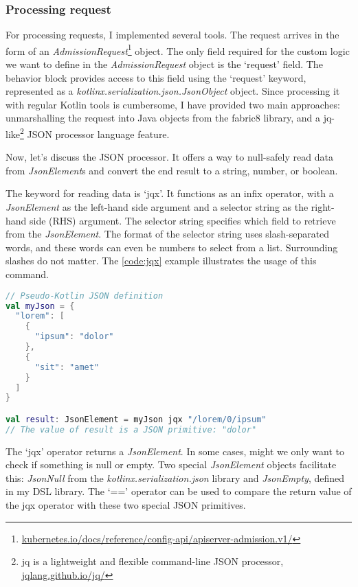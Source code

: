 \subsubsection{Processing request}

For processing requests, I implemented several tools. The request arrives in the form of an \emph{AdmissionRequest}\footnote{\url{kubernetes.io/docs/reference/config-api/apiserver-admission.v1/}} object. The only field required for the custom logic we want to define in the \emph{AdmissionRequest} object is the `request' field. The behavior block provides access to this field using the `request' keyword, represented as a \emph{kotlinx.serialization.json.JsonObject} object. Since processing it with regular Kotlin tools is cumbersome, I have provided two main approaches: unmarshalling the request into Java objects from the fabric8 library, and a jq-like\footnote{jq is a lightweight and flexible command-line JSON processor, \url{jqlang.github.io/jq/}} JSON processor language feature.

Now, let's discuss the JSON processor. It offers a way to null-safely read data from \emph{JsonElement}s and convert the end result to a string, number, or boolean.

The keyword for reading data is `jqx'. It functions as an infix operator, with a \emph{JsonElement} as the left-hand side argument and a selector string as the right-hand side (RHS) argument. The selector string specifies which field to retrieve from the \emph{JsonElement}. The format of the selector string uses slash-separated words, and these words can even be numbers to select from a list. Surrounding slashes do not matter. The \ref{code:jqx} example illustrates the usage of this command.

\begin{lstlisting}[caption={Usage of `jqx'},language=Kotlin,label=code:jqx]
// Pseudo-Kotlin JSON definition
val myJson = {
  "lorem": [
    {
      "ipsum": "dolor"
    },
    {
      "sit": "amet"
    }
  ]
}

val result: JsonElement = myJson jqx "/lorem/0/ipsum"
// The value of result is a JSON primitive: "dolor"
\end{lstlisting}

The `jqx' operator returns a \emph{JsonElement}. In some cases, might we only want to check if something is null or empty. Two special \emph{JsonElement} objects facilitate this: \emph{JsonNull} from the \emph{kotlinx.serialization.json} library and \emph{JsonEmpty}, defined in my DSL library. The `==' operator can be used to compare the return value of the jqx operator with these two special JSON primitives.

